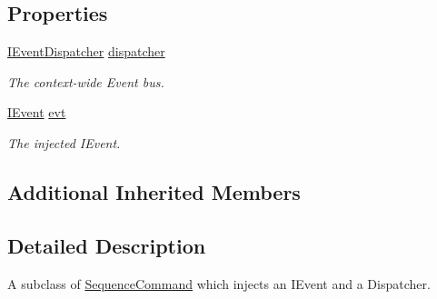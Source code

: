 \subsection*{Properties}
\begin{DoxyCompactItemize}
\item 
\hypertarget{classstrange_1_1extensions_1_1sequencer_1_1impl_1_1_event_sequence_command_a3b0bd45295ae480feb228090153e4aa4}{\hyperlink{interfacestrange_1_1extensions_1_1dispatcher_1_1eventdispatcher_1_1api_1_1_i_event_dispatcher}{I\-Event\-Dispatcher} \hyperlink{classstrange_1_1extensions_1_1sequencer_1_1impl_1_1_event_sequence_command_a3b0bd45295ae480feb228090153e4aa4}{dispatcher}}\label{classstrange_1_1extensions_1_1sequencer_1_1impl_1_1_event_sequence_command_a3b0bd45295ae480feb228090153e4aa4}

\begin{DoxyCompactList}\small\item\em The context-\/wide Event bus. \end{DoxyCompactList}\item 
\hypertarget{classstrange_1_1extensions_1_1sequencer_1_1impl_1_1_event_sequence_command_a9299b7ee26623269418a2f54b4158101}{\hyperlink{interfacestrange_1_1extensions_1_1dispatcher_1_1eventdispatcher_1_1api_1_1_i_event}{I\-Event} \hyperlink{classstrange_1_1extensions_1_1sequencer_1_1impl_1_1_event_sequence_command_a9299b7ee26623269418a2f54b4158101}{evt}}\label{classstrange_1_1extensions_1_1sequencer_1_1impl_1_1_event_sequence_command_a9299b7ee26623269418a2f54b4158101}

\begin{DoxyCompactList}\small\item\em The injected I\-Event. \end{DoxyCompactList}\end{DoxyCompactItemize}
\subsection*{Additional Inherited Members}


\subsection{Detailed Description}
A subclass of \hyperlink{classstrange_1_1extensions_1_1sequencer_1_1impl_1_1_sequence_command}{Sequence\-Command} which injects an I\-Event and a Dispatcher. 

